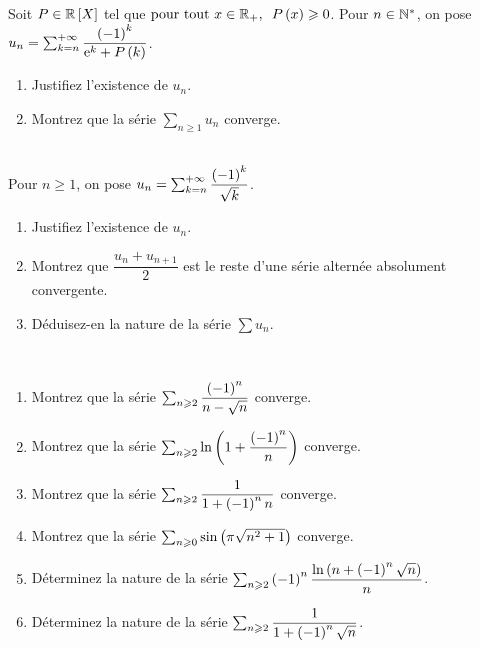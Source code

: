 \begin{exoss}[Exercice 8]
Soit \(P\in\poly[\R]\) tel que \(\quantifs{\tpt x\in\Rp}P\paren{x}\geq0\). Pour \(n\in\mathbb{N}^*\), on pose \(u_n=\sum_{k=n}^{+\infty}\dfrac{\left(-1\right)^k}{\mathrm{e}^{k}+P\left(k\right)}\).

\begin{enumerate}
    \item Justifiez l'existence de \(u_n\). \\
    \item Montrez que la série \(\sum_{n\geq1}u_n\) converge.
\end{enumerate}
\end{exoss}



\begin{exoss}[Exercice 9]~\\
Pour \(n\geq1\), on pose \(u_n=\sum_{k=n}^{+\infty}\dfrac{\left(-1\right)^k}{\sqrt{k}}\).

\begin{enumerate}
    \item Justifiez l'existence de \(u_n\). \\
    \item Montrez que \(\dfrac{u_n+u_{n+1}}{2}\) est le reste d'une série alternée absolument convergente. \\
    \item Déduisez-en la nature de la série \(\sum u_n\).
\end{enumerate}
\end{exoss}



\begin{exoss}~\\
\begin{enumerate}
    \item Montrez que la série \(\sum_{n\geqslant2}\dfrac{\left(-1\right)^n}{n-\sqrt{n}}\) converge. \\
    \item Montrez que la série \(\sum_{n\geqslant2}\ln\left(1+\dfrac{\left(-1\right)^n}{n}\right)\) converge. \\
    \item Montrez que la série \(\sum_{n\geqslant2}\dfrac{1}{1+\left(-1\right)^nn}\) converge. \\
    \item Montrez que la série \(\sum_{n\geqslant0}\sin\left(\pi\sqrt{n^2+1}\right)\) converge. \\
    \item Déterminez la nature de la série \(\sum_{n\geqslant2}\left(-1\right)^n\dfrac{\ln\left(n+\left(-1\right)^n\sqrt{n}\right)}{n}\). \\
    \item Déterminez la nature de la série \(\sum_{n\geqslant2}\dfrac{1}{1+\left(-1\right)^n\sqrt{n}}\).
\end{enumerate}
\end{exoss}



